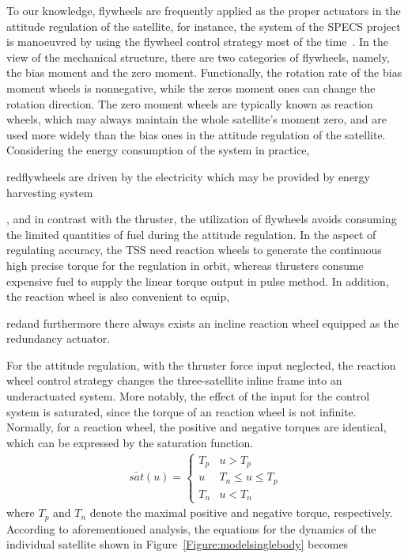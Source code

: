 To our knowledge, flywheels are frequently applied as the proper actuators in the attitude regulation of the satellite, for instance, the system of the SPECS project is manoeuvred by using the flywheel control strategy most of the time~\cite{chung2008propellant1}. In the view of the mechanical structure, there are two categories of flywheels, namely, the bias moment and the zero moment. Functionally, the rotation rate of the bias moment wheels is nonnegative, while the zeros moment ones can change the rotation direction. The zero moment wheels are typically known as reaction wheels, which may always maintain the whole satellite's moment zero, and are used more widely than the bias ones in the attitude regulation of the satellite. Considering the energy consumption of the system in practice, \begin{color}{red}flywheels are driven by the electricity which may be provided by energy harvesting system\end{color}, and in contrast with the thruster, the utilization of flywheels avoids consuming the limited quantities of fuel during the attitude regulation. In the aspect of regulating accuracy, the TSS need reaction wheels to generate the continuous high precise torque for the regulation in orbit, whereas thrusters consume expensive fuel to supply the linear torque output in pulse method. In addition, the reaction wheel is also convenient to equip, \begin{color}{red}and furthermore there always exists an incline reaction wheel equipped as the redundancy actuator.\end{color} For the attitude regulation, with the thruster force input neglected, the reaction wheel control strategy changes the three-satellite inline frame into an underactuated system. More notably, the effect of the input for the control system is saturated, since the torque of an reaction wheel is not infinite. Normally, for a reaction wheel, the positive and negative torques are identical, which can be expressed by the saturation function.
\begin{align}
\bar{sat}(u)=
\begin{cases}
T_p &u > T_p\\
u   &T_n\le u\le T_p\\
T_n &u < T_n
\end{cases}
\end{align}
where $T_p$ and $T_n$ denote the maximal positive and negative torque, respectively. According to aforementioned analysis, the equations for the dynamics of the individual satellite shown in Figure~\ref{Figure:modelsinglebody} becomes
